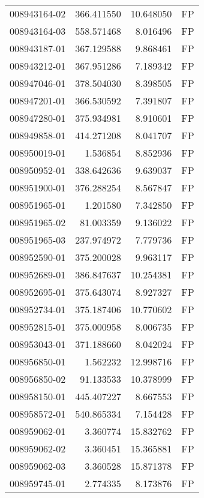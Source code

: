 \begin{tabular}{lrrl}
008943164-02 &  366.411550 &      10.648050 &   FP \\
008943164-03 &  558.571468 &       8.016496 &   FP \\
008943187-01 &  367.129588 &       9.868461 &   FP \\
008943212-01 &  367.951286 &       7.189342 &   FP \\
008947046-01 &  378.504030 &       8.398505 &   FP \\
008947201-01 &  366.530592 &       7.391807 &   FP \\
008947280-01 &  375.934981 &       8.910601 &   FP \\
008949858-01 &  414.271208 &       8.041707 &   FP \\
008950019-01 &    1.536854 &       8.852936 &   FP \\
008950952-01 &  338.642636 &       9.639037 &   FP \\
008951900-01 &  376.288254 &       8.567847 &   FP \\
008951965-01 &    1.201580 &       7.342850 &   FP \\
008951965-02 &   81.003359 &       9.136022 &   FP \\
008951965-03 &  237.974972 &       7.779736 &   FP \\
008952590-01 &  375.200028 &       9.963117 &   FP \\
008952689-01 &  386.847637 &      10.254381 &   FP \\
008952695-01 &  375.643074 &       8.927327 &   FP \\
008952734-01 &  375.187406 &      10.770602 &   FP \\
008952815-01 &  375.000958 &       8.006735 &   FP \\
008953043-01 &  371.188660 &       8.042024 &   FP \\
008956850-01 &    1.562232 &      12.998716 &   FP \\
008956850-02 &   91.133533 &      10.378999 &   FP \\
008958150-01 &  445.407227 &       8.667553 &   FP \\
008958572-01 &  540.865334 &       7.154428 &   FP \\
008959062-01 &    3.360774 &      15.832762 &   FP \\
008959062-02 &    3.360451 &      15.365881 &   FP \\
008959062-03 &    3.360528 &      15.871378 &   FP \\
008959745-01 &    2.774335 &       8.173876 &   FP \\

\end{tabular}

